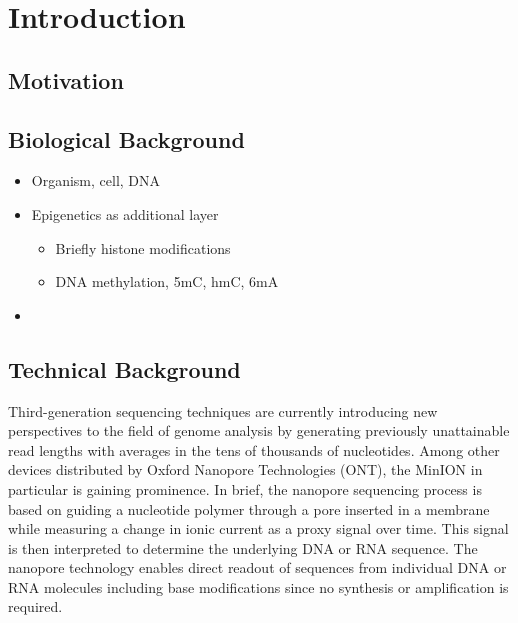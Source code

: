 \chapter{Introduction}
\label{sec:intro}



\section{Motivation}
\label{sec:intro:motivation}

\section{Biological Background}
\label{sec:intro:bio}

\begin{itemize}
    \item Organism, cell, DNA
    \item Epigenetics as additional layer
    \begin{itemize}
        \item Briefly histone modifications
        \item DNA methylation, 5mC, hmC, 6mA
    \end{itemize}
    \item 
\end{itemize}


\section{Technical Background}
\label{sec:intro:sequencing}

Third-generation sequencing techniques are currently introducing new perspectives to the field of genome analysis by generating previously unattainable read lengths with averages in the tens of thousands of nucleotides. Among other devices distributed by Oxford Nanopore Technologies (ONT), the MinION in particular is gaining prominence. In brief, the nanopore sequencing process is based on guiding a nucleotide polymer through a pore inserted in a membrane while measuring a change in ionic current as a proxy signal over time. This signal is then interpreted to determine the underlying DNA or RNA sequence. The nanopore technology enables direct readout of sequences from individual DNA or RNA molecules including base modifications since no synthesis or amplification is required.

